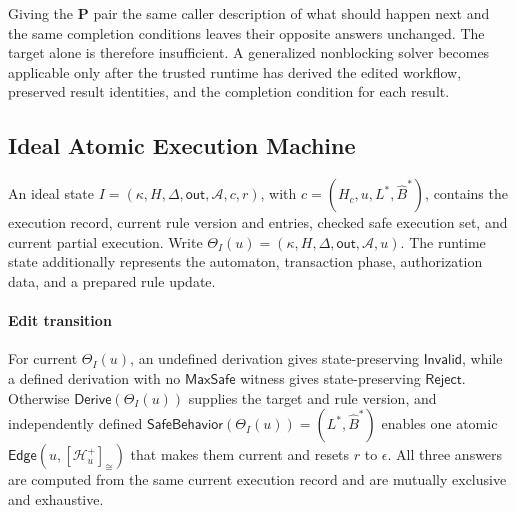 Giving the \(\mathbf P\) pair the same caller description of what should happen next and the same completion conditions leaves their opposite answers unchanged.
The target alone is therefore insufficient.
A generalized nonblocking solver becomes applicable only after the trusted runtime has derived the edited workflow, preserved result identities, and the completion condition for each result.

\subsection{Ideal Atomic Execution Machine}
\label{sec:ideal}

An ideal state \(I=(\kappa,H,\Delta,\mathsf{out},\mathcal A,c,r)\), with \(c=(H_c,u,L^*,\widehat B^*)\), contains the execution record, current rule version and entries, checked safe execution set, and current partial execution.
Write \(\Theta_I(u)=(\kappa,H,\Delta,\mathsf{out},\mathcal A,u)\).
The runtime state additionally represents the automaton, transaction phase, authorization data, and a prepared rule update.

\paragraph{Edit transition}
For current \(\Theta_I(u)\), an undefined derivation gives state-preserving \(\mathsf{Invalid}\), while a defined derivation with no \(\mathsf{MaxSafe}\) witness gives state-preserving \(\mathsf{Reject}\).
Otherwise \(\mathsf{Derive}(\Theta_I(u))\) supplies the target and rule version, and independently defined \(\mathsf{SafeBehavior}(\Theta_I(u))=(L^*,\widehat B^*)\) enables one atomic \(\mathsf{Edge}(u,[\mathcal H_u^+]_{\cong})\) that makes them current and resets \(r\) to \(\epsilon\).
All three answers are computed from the same current execution record and are mutually exclusive and exhaustive.

